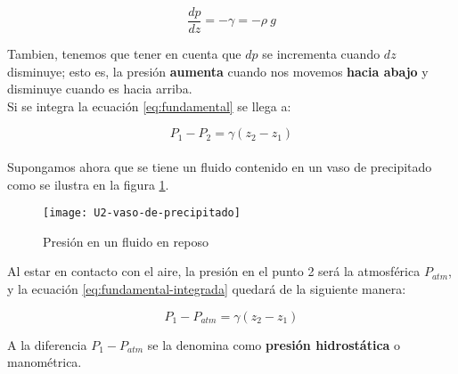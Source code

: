 \begin{equation}
	\dfrac{dp}{dz}= - \gamma = - \rho\ g
	\label{eq:fundamental}
\end{equation}

Tambien, tenemos que tener en cuenta que $dp$ se incrementa cuando $dz$ disminuye; esto es, la presión \textbf{aumenta} cuando nos movemos \textbf{hacia abajo} y disminuye cuando es hacia arriba.\\

Si se integra la ecuación \ref{eq:fundamental} se llega a:

\begin{equation}
	P_1 - P_2 = \gamma (z_2 - z_1)
	\label{eq:fundamental-integrada}
\end{equation}\\


Supongamos ahora que se tiene un fluido contenido en un vaso de precipitado como se ilustra en la figura \ref{fig:precipitado}. 

\begin{figure}[H]
	\centering
	\texttt{[image: U2-vaso-de-precipitado]}
	\caption{Presión en un fluido en reposo}
	\label{fig:precipitado}
\end{figure}

Al estar en contacto con el aire, la presión en el punto 2 será la atmosférica $P_{atm}$, y la ecuación \ref{eq:fundamental-integrada} quedará de la siguiente manera:




\begin{equation}
	P_1 - P_{atm} = \gamma (z_2 - z_1)
\end{equation}


A la diferencia $P_1 - P_{atm}$ se la denomina como \textbf{presión hidrostática} o manométrica.\\



